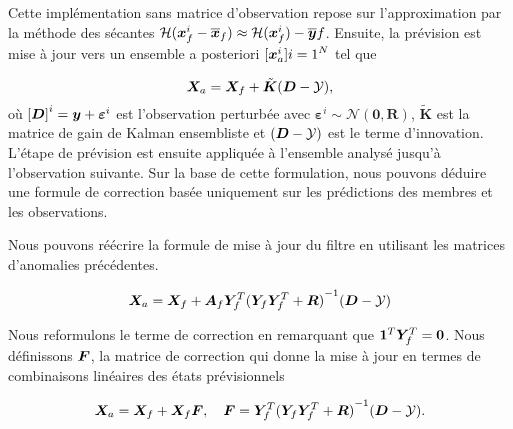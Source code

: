 Cette implémentation sans matrice d'observation repose sur l'approximation par la méthode des sécantes $\mathcal{H}(\bm{x}^i_f - \overline{\bm{x}}_f) \approx \mathcal{H} (\bm{x}^i_f) - \overline{\bm{y}}f$.
Ensuite, la prévision est mise à jour vers un ensemble a posteriori ${[\bm{x}^i_a]}{i=1}^{N}$ tel que

\begin{equation} \label{eq:enkf_formula}
    \bm{X}_a = \bm{X}_f + \tilde{\bm{K}} ( \bm{D} - \mathcal{Y}),
\end{equation}
où ${[\bm{D}]}^i = \bm{y} + \bm{\varepsilon}^i$ est l'observation perturbée avec $\bm{\varepsilon}^i \sim \mathcal{N}(\bm{0}, \bm R) $, $\tilde{\bm{K}}$ est la matrice de gain de Kalman ensembliste et $( \bm{D} - \mathcal{Y})$ est le terme d'innovation.
L'étape de prévision est ensuite appliquée à l'ensemble analysé jusqu'à l'observation suivante.
Sur la base de cette formulation, nous pouvons déduire une formule de correction basée uniquement sur les prédictions des membres et les observations.

Nous pouvons réécrire la formule de mise à jour du filtre en utilisant les matrices d'anomalies précédentes.

\begin{equation*}
    \bm{X}_a = \bm{X}_f + \bm A_f \bm Y_f^T {({\bm Y_f \bm Y_f^T + \bm R})}^{-1}(\bm{D} - \mathcal{Y})
\end{equation*}

Nous reformulons le terme de correction en remarquant que $ \bm{1}^T \bm Y_f^T = \bm{0}$. Nous définissons $\bm{F}$, la matrice de correction qui donne la mise à jour en termes de combinaisons linéaires des états prévisionnels

\begin{equation}
    \bm{X}_a = \bm{X}_f + \bm{X}_f \bm{F}, \quad \bm{F} = \bm Y_f^T {(\bm Y_f \bm Y_f^T + \bm R)}^{-1}(\bm{D} - \mathcal{Y}).
\end{equation}




